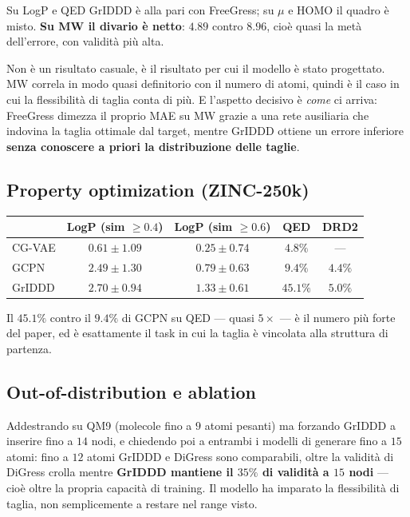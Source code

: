 \begin{tcolorbox}[mybox, title={Il caso da raccontare: il peso molecolare}]
Su LogP e QED GrIDDD è alla pari con FreeGress; su $\mu$ e HOMO il quadro è misto. \textbf{Su MW il divario è netto}: $4.89$ contro $8.96$, cioè quasi la metà dell'errore, con validità più alta.

Non è un risultato casuale, è il risultato per cui il modello è stato progettato. MW correla in modo quasi definitorio con il numero di atomi, quindi è il caso in cui la flessibilità di taglia conta di più. E l'aspetto decisivo è \emph{come} ci arriva: FreeGress dimezza il proprio MAE su MW grazie a una rete ausiliaria che indovina la taglia ottimale dal target, mentre GrIDDD ottiene un errore inferiore \textbf{senza conoscere a priori la distribuzione delle taglie}.
\end{tcolorbox}

\subsection{Property optimization (ZINC-250k)}

\begin{center}
\begin{tabular}{lcccc}
\toprule
 & LogP (sim $\geq 0.4$) & LogP (sim $\geq 0.6$) & QED & DRD2 \\
\midrule
CG-VAE & $0.61 \pm 1.09$ & $0.25 \pm 0.74$ & $4.8\%$ & --- \\
GCPN   & $2.49 \pm 1.30$ & $0.79 \pm 0.63$ & $9.4\%$ & $4.4\%$ \\
GrIDDD & $\mathbf{2.70} \pm 0.94$ & $\mathbf{1.33} \pm 0.61$ & $\mathbf{45.1\%}$ & $\mathbf{5.0\%}$ \\
\bottomrule
\end{tabular}
\end{center}

Il $45.1\%$ contro il $9.4\%$ di GCPN su QED — quasi $5\times$ — è il numero più forte del paper, ed è esattamente il task in cui la taglia è vincolata alla struttura di partenza.

\subsection{Out-of-distribution e ablation}

Addestrando su QM9 (molecole fino a $9$ atomi pesanti) ma forzando GrIDDD a inserire fino a $14$ nodi, e chiedendo poi a entrambi i modelli di generare fino a $15$ atomi: fino a $12$ atomi GrIDDD e DiGress sono comparabili, oltre la validità di DiGress crolla mentre \textbf{GrIDDD mantiene il $35\%$ di validità a $15$ nodi} — cioè oltre la propria capacità di training. Il modello ha imparato la flessibilità di taglia, non semplicemente a restare nel range visto.

